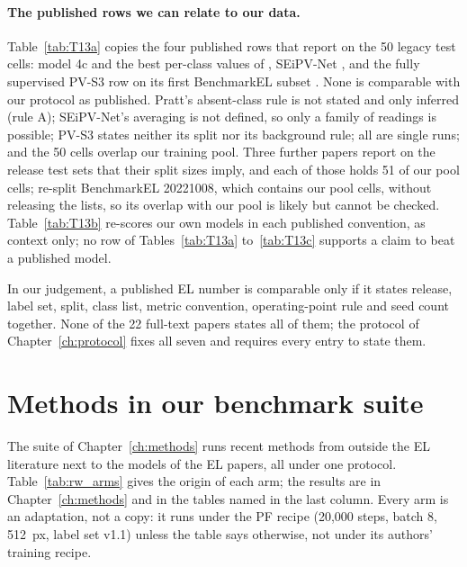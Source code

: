 \paragraph{The published rows we can relate to our data.} Table~\ref{tab:T13a} copies the four published rows that report on
the 50 legacy test cells: model 4c and the best per-class values of \citet{pratt2023benchmark}, SEiPV-Net
\citep{eesaar2023seipv}, and the fully supervised PV-S3 row on its first BenchmarkEL subset \citep{jha2025pvs3}. None is
comparable with our protocol as published. Pratt's absent-class rule is not stated and only inferred (rule A); SEiPV-Net's
averaging is not defined, so only a family of readings is possible; PV-S3 states neither its split nor its background rule;
all are single runs; and the 50 cells overlap our training pool. Three further papers
\citep{mazen2024segnet,ramadan2026hybrid,torpey2024pretraining} report on the release test sets that their split sizes imply, and
each of those holds 51 of our pool cells; \citet{hanifi2025multiclass} re-split BenchmarkEL 20221008, which contains our pool
cells, without releasing the lists, so its overlap with our pool is likely but cannot be checked. Table~\ref{tab:T13b} re-scores our own models in each published convention, as context only; no row of
Tables~\ref{tab:T13a} to~\ref{tab:T13c} supports a claim to beat a published model.

In our judgement, a published EL number is comparable only if it states release, label set, split, class list, metric
convention, operating-point rule and seed count together. None of the 22 full-text papers states all of them; the protocol
of Chapter~\ref{ch:protocol} fixes all seven and requires every entry to state them.

\section{Methods in our benchmark suite}\label{sec:rw_methods}

The suite of Chapter~\ref{ch:methods} runs recent methods from outside the EL literature next to the models of the EL papers,
all under one protocol. Table~\ref{tab:rw_arms} gives the origin of each arm; the results are in Chapter~\ref{ch:methods} and
in the tables named in the last column. Every arm is an adaptation, not a copy: it runs under the PF recipe (20,000 steps,
batch 8, 512~px, label set v1.1) unless the table says otherwise, not under its authors' training recipe.

